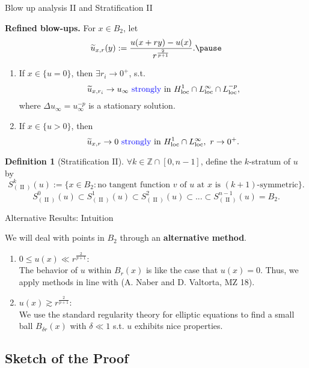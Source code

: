 \documentclass[11pt]{beamer}
\newcommand{\Z}{\mathbb{Z}}
\newcommand{\ift}{\infty}
\newcommand{\wt}{\widetilde}
\newcommand{\f}{\frac}
\newcommand{\op}{\operatorname}
\DeclareMathOperator{\loc}{loc}
\theoremstyle{plain}
\theoremstyle{definition}
\newtheorem{defn}[thm]{Definition}
\begin{document}
\begin{frame}{Blow up analysis II and Stratification II}

\textbf{Refined blow-ups.} For $ x\in B_2 $, let
$$
\wt{u}_{x,r}(y):=\f{u(x+ry)-u(x)}{r^{\f{2}{p+1}}}.\pause
$$
\begin{enumerate}
\item If $ x\in\{u=0\} $, then $ \exists r_i\to 0^+ $, s.t.
$$
\wt{u}_{x,r_i}\to u_{\ift}\text{ \textcolor{blue}{strongly} in }H_{\loc}^1\cap L_{\loc}^{\ift}\cap L_{\loc}^{-p},
$$
where $ \Delta u_{\ift}=u_{\ift}^{-p} $ is a stationary solution.\pause
\item If $ x\in\{u>0\} $, then
$$
\wt{u}_{x,r}\to 0\text{ \textcolor{blue}{strongly} in }H_{\loc}^1\cap L_{\loc}^{\ift},\,\,r\to 0^+.
$$
\end{enumerate}\pause

\begin{defn}[Stratification II]
$ \forall k\in\Z\cap[0,n-1] $, define the $ k $-stratum of $ u $ by
$$
S_{(\op{II})}^k(u):=\{x\in B_2:\text{no tangent function }v\text{ of }u\text{ at }x\text{ is }(k+1)\text{-symmetric}\}.
$$
$$
S_{(\op{II})}^0(u)\subset S_{(\op{II})}^1(u)\subset S_{(\op{II})}^2(u)\subset...\subset S_{(\op{II})}^{n-1}(u)=B_2.
$$
\end{defn}

\end{frame}

\begin{frame}{Alternative Results: Intuition}

We will deal with points in $ B_2 $ through an \textbf{alternative method}.\pause

\begin{enumerate}
\item $ 0\leq u(x)\ll r^{\f{2}{p+1}} $: \\
The behavior of $ u $ within $ B_r(x) $ is like the case that $ u(x)=0 $. Thus, we apply methods in line with (A. Naber and D. Valtorta, MZ 18).\pause
\item $ u(x)\gtrsim r^{\f{2}{p+1}} $: \\
We use the standard regularity theory for elliptic equations to find a small ball $ B_{\delta r}(x) $ with $ \delta\ll 1 $ s.t. $ u $ exhibits nice properties.
\end{enumerate}

\end{frame}


\subsection{Sketch of the Proof}
\end{document}
